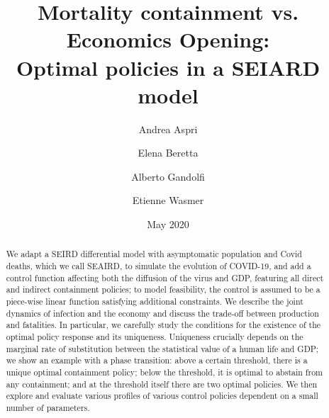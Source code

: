 \documentclass{amsart}
\date{May 2020}
\begin{document}
\title[Mortality containment vs. Economics Opening]{Mortality containment vs. Economics Opening:
{\\ \small Optimal policies in a SEIARD model} }
\author[A. Aspri, E. Beretta, A. Gandolfi, E. Wasmer]{Andrea Aspri}
\address{ Johann Radon Institute for Computational and Applied Mathematics (RICAM)}

\author[]{Elena Beretta}
\address{Department of Mathematics, NYU-Abu Dhabi, and Dipartimento di Matematica, Politecnico di Milano}

\author[]{Alberto Gandolfi}
\address{Department of Mathematics, NYU-Abu Dhabi}

\author[]{Etienne Wasmer}
\address{Department of Economics, Social Science Div. NYU-Abu Dhabi}

 

\maketitle

\begin{abstract}


We adapt a SEIRD differential model with asymptomatic population and Covid deaths, which we call SEAIRD, to simulate the evolution of COVID-19, and add a  control function affecting both the diffusion of the virus and GDP, featuring all direct and indirect containment policies; to model
 feasibility, the control is assumed to be a  piece-wise linear function satisfying additional constraints. We describe the joint dynamics of infection and the economy and discuss the trade-off between production and fatalities. In particular, we carefully study the conditions for the existence of the optimal policy response and its uniqueness. Uniqueness crucially depends on the marginal rate of substitution between the statistical  value of a human life and GDP; we show  an example with a phase transition: above a certain threshold, there is a unique optimal containment policy; below the threshold, it is optimal to abstain from any containment; and at the threshold itself there are two optimal policies. We then explore and evaluate various profiles of various control policies dependent on a small number of parameters.    




\end{abstract}
\newpage
\end{document}
